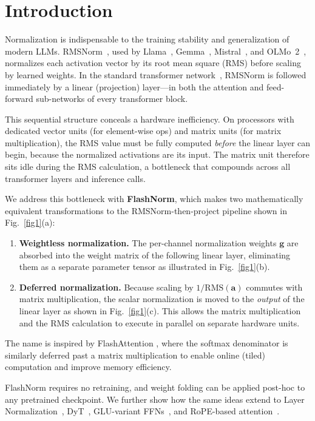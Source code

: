 \documentclass{article}
\begin{document}
\section{Introduction}
Normalization is indispensable to the training stability and generalization of
modern LLMs. RMSNorm~\citep{rms}, used by Llama~\citep{LLaMA},
Gemma~\citep{gemma}, Mistral~\citep{mistral}, and
OLMo~2~\citep{olmo2}, normalizes each activation vector by its root mean
square (RMS) before scaling by learned weights. In the standard transformer network~\citep{vanilla},
RMSNorm is followed immediately by a linear (projection) layer---in both the attention and
feed-forward sub-networks of every transformer block.

This sequential structure conceals a hardware inefficiency. On processors with
dedicated vector units (for element-wise ops) and matrix units (for matrix multiplication), the
RMS value must be fully computed \emph{before} the linear layer can begin, because
the normalized activations are its input. The matrix unit therefore sits idle during
the RMS calculation, a bottleneck that compounds across all transformer layers and inference calls.

We address this bottleneck with \textbf{FlashNorm}, which makes two
mathematically equivalent transformations to the RMSNorm-then-project pipeline shown in
Fig.~\ref{fig1}(a):

\begin{enumerate}
  \item \textbf{Weightless normalization.} The per-channel normalization weights
        $\mathbf{g}$ are absorbed into the weight matrix of the following linear layer,
        eliminating them as a separate parameter tensor as illustrated in Fig.~\ref{fig1}(b).
  \item \textbf{Deferred normalization.} Because scaling by $1/\mathrm{RMS}(\mathbf{a})$
        commutes with matrix multiplication, the scalar normalization is
        moved to the \emph{output} of the linear layer as shown in Fig.~\ref{fig1}(c).
        This allows the matrix multiplication and the RMS calculation to execute in parallel on separate
        hardware units.
\end{enumerate}

The name is inspired by FlashAttention \citep{flash-attention}, where the
softmax denominator is similarly deferred past a matrix multiplication to enable
online (tiled) computation and improve memory efficiency.

FlashNorm requires no retraining, and weight folding can be applied post-hoc to any pretrained
checkpoint. We further show how the same ideas extend to Layer Normalization~\citep{layerNorm},
DyT~\citep{DyT}, GLU-variant FFNs~\citep{GLU}, and RoPE-based attention~\citep{RoPE}.
\end{document}
